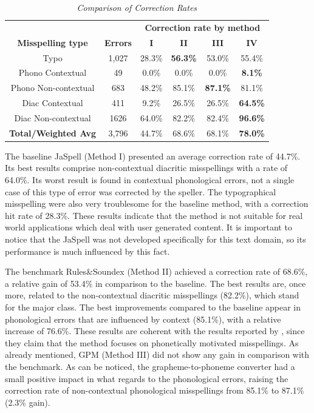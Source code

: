 {\setlength{\tabcolsep}{0.6em}
\begin{table}[htbp]
\centering
\caption{\it Comparison of Correction Rates}
\begin{center}
\begin{tabular}{|cccccc|}
\hline
\multicolumn{1}{|c}{} & \multicolumn{1}{c}{} & \multicolumn{ 4}{c|}{\textbf{Correction rate by method}} \\ \cline{ 3- 6}
\multicolumn{1}{|c}{\textbf{Misspelling type}} & \multicolumn{1}{c}{\textbf{Errors}} & \multicolumn{1}{c}{\bf I} & \multicolumn{1}{c}{\bf II} & \multicolumn{1}{c}{\bf III} & \multicolumn{1}{c|}{\bf IV} \\ \hline
Typo & 1,027 & 28.3\% & \textbf{56.3\%} & 53.0\% & 55.4\% \\ 
Phono Contextual & 49 & 0.0\% & 0.0\% & 0.0\% & \textbf{8.1\%} \\ 
Phono Non-contextual & 683 & 48.2\% & 85.1\% & \textbf{87.1\%} & 81.1\% \\ 
Diac Contextual & 411 & 9.2\% & 26.5\% & 26.5\% & \textbf{64.5\%} \\ 
Diac Non-contextual & 1626 & 64.0\% & 82.2\% & 82.4\% & \textbf{96.6\%} \\ \hline
\textbf{Total/Weighted Avg} & 3,796 & 44.7\% & 68.6\% & 68.1\% & \textbf{78.0\%} \\ \hline

\end{tabular}
\end{center}
\label{tab:corr-rate-by-speller}
\end{table}
}

The baseline JaSpell (Method I) presented an average correction rate of 44.7\%. Its best results comprise non-contextual diacritic misspellings with a rate of 64.0\%. Its worst result is found in contextual phonological errors, not a single case of this type of error was corrected by the speller. The typographical
misspelling were also very troublesome for the baseline method, with a correction 
hit rate of 28.3\%. These results indicate that the method is not suitable for real world applications which deal with user generated content. It is important to notice that the JaSpell was not developed specifically for this text domain, so its performance is much influenced by this fact.

The benchmark Rules\&Soundex (Method II) achieved a correction rate of 68.6\%, a relative gain of 53.4\% in comparison to the baseline. The best results are, once more, related to the non-contextual diacritic misspellings (82.2\%), which stand for the major class. The best improvements compared to the baseline appear in phonological errors that are influenced by context (85.1\%), with a relative increase of 76.6\%. These results are coherent with the results reported by \cite{Avanco2014}, since they claim that the method focuses on phonetically motivated misspellings.
As already mentioned, GPM (Method III) did not show any gain in comparison with the benchmark. As can be noticed, the grapheme-to-phoneme converter had a small positive impact in what regards to the phonological errors, raising the correction rate of non-contextual phonological misspellings from 85.1\% to 87.1\% (2.3\% gain). 

